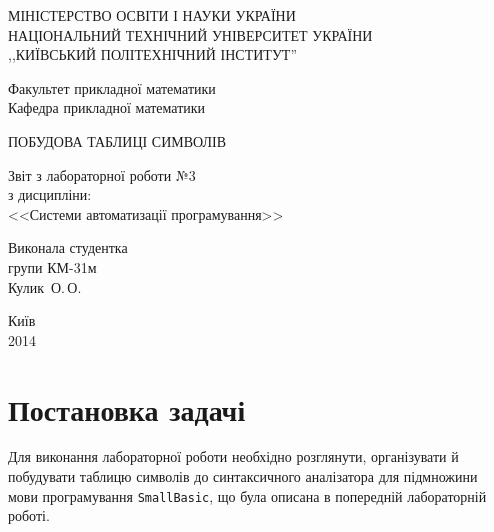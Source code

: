 \documentclass[a4paper,12pt,notitlepage,pdftex]{scrreprt}
\begin{document}
\begin{titlepage}
    \begin{center}
        \MakeUppercase{Міністерство освіти і науки України}\\
        \MakeUppercase{Національний технічний університет України}\\
        \MakeUppercase{,,Київський політехнічний інститут''}\\
        \vspace*{2em}

        Факультет прикладної математики\\
        Кафедра прикладної математики

        \vfill

        \MakeUppercase{Побудова таблиці символів}\\
        \vspace*{1em}

        Звіт з лабораторної роботи №3\\
        з дисципліни:\\
        <<Системи автоматизації програмування>>
    \end{center}

    \vfill
    \hfill\begin{minipage}{0.4\textwidth}
        Виконала студентка\\
        групи КМ-31м\\
        Кулик~О.\,О.
    \end{minipage}

    \vfill
    \begin{center}
        Київ\\
        2014
    \end{center}
\end{titlepage}

\tableofcontents

\chapter{Постановка задачі}
\label{chap:first}
    Для виконання лабораторної роботи необхідно розглянути, організувати й побудувати таблицю символів до
    синтаксичного аналізатора для підмножини мови програмування \texttt{SmallBasic}, що була описана в попередній
    лабораторній роботі.
\end{document}
